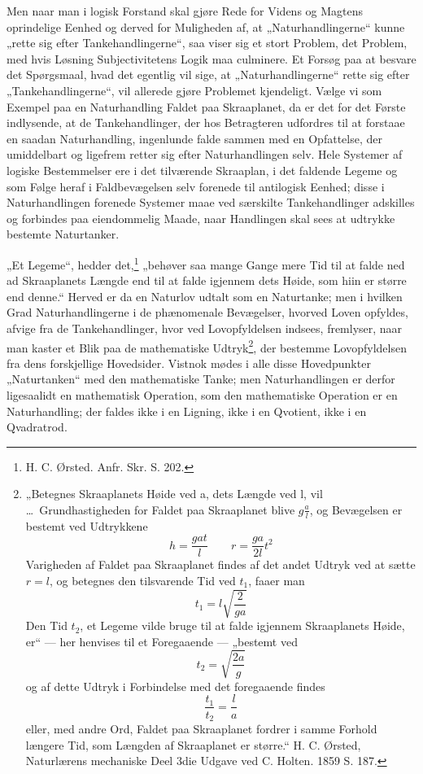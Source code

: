 \documentclass[11pt]{book}
\newcommand{\opage}[1]{\marginnote{\footnotesize\textit{[#1]}}}
\begin{document}
Men naar man i logisk Forstand skal gjøre Rede for Videns og Magtens
oprindelige Eenhed og derved for Muligheden af, at „Naturhandlingerne“
kunne „rette sig efter Tankehandlingerne“, saa viser sig et stort
Problem, det Problem, med hvis Løsning Subjectivitetens Logik maa
culminere. Et Forsøg paa at besvare det Spørgsmaal, hvad det egentlig
vil sige, at „Naturhandlingerne“ rette sig efter „Tankehandlingerne“,
vil allerede gjøre Problemet kjendeligt. Vælge vi som Exempel paa en
Naturhandling Faldet paa Skraaplanet, da er det for det Første
indlysende, at de Tankehandlinger, der hos Betragteren udfordres til at
forstaae en saadan Naturhandling, ingenlunde falde sammen med en
Opfattelse, der umiddelbart og ligefrem retter sig efter
Naturhandlingen selv. Hele Systemer af logiske Bestemmelser ere i det
tilværende Skraaplan, i det faldende Legeme og som Følge heraf i
Faldbevægelsen selv forenede til antilogisk Eenhed; disse i
Naturhandlingen forenede Systemer maae ved særskilte Tankehandlinger
adskilles og forbindes paa eiendommelig Maade, naar Handlingen skal
sees at udtrykke bestemte Naturtanker.

„Et Legeme“, hedder det,\footnote{H. C. Ørsted. Anfr. Skr. S. 202.}
„behøver saa mange Gange mere Tid til at falde ned ad Skraaplanets
Længde end til at falde igjennem dets Høide, som hiin er større end
denne.“ Herved er da en Naturlov udtalt som en Naturtanke; men i
hvilken Grad Naturhandlingerne i de phænomenale Bevægelser, hvorved
Loven opfyldes, afvige fra de Tankehandlinger, hvor\-%
\opage{211} \setcounter{footnote}{0}%
ved Lovopfyldelsen indsees, fremlyser, naar man kaster et Blik paa de
mathematiske Udtryk\footnote{„Betegnes Skraaplanets Høide ved a, dets
Længde ved l, vil \dots\ Grundhastigheden for Faldet paa Skraaplanet
blive $g\frac{a}{l}$, og Bevægelsen er bestemt ved Udtrykkene
\[ h = \frac{gat}{l} \qquad r = \frac{ga}{2l}t^2 \]
Varigheden af Faldet paa Skraaplanet findes af det andet Udtryk ved at
sætte $r = l$, og betegnes den tilsvarende Tid ved $t_1$, faaer man
\[ t_1 = l\sqrt{\frac{2}{ga}} \]
Den Tid $t_2$, et Legeme vilde bruge til at falde igjennem
Skraaplanets Høide, er“ --- her henvises til et Foregaaende ---
„bestemt ved
\[ t_2 = \sqrt{\frac{2a}{g}} \]
og af dette Udtryk i Forbindelse med det foregaaende findes
\[ \frac{t_1}{t_2} = \frac{l}{a} \]
eller, med andre Ord, Faldet paa Skraaplanet fordrer i samme Forhold
længere Tid, som Længden af Skraaplanet er større.“ H. C. Ørsted,
Naturlærens mechaniske Deel 3die Udgave ved C. Holten. 1859 S. 187.},
der bestemme Lovopfyldelsen fra dens forskjellige Hovedsider. Vistnok
mødes i alle disse Hovedpunkter „Naturtanken“ med den mathematiske
Tanke; men Naturhandlingen er derfor ligesaalidt en mathematisk
Operation, som den mathematiske Operation er en Naturhandling; der
faldes ikke i en Ligning, ikke i en Qvotient, ikke i en Qvadratrod.
\end{document}
